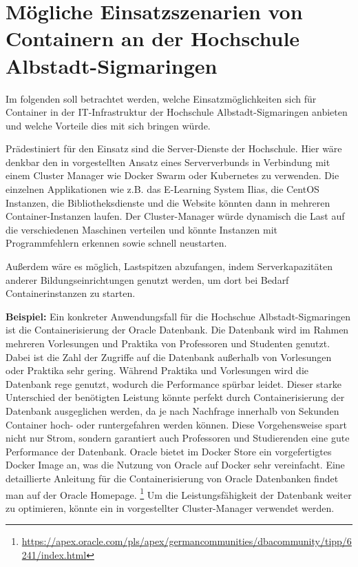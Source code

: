 \section{Mögliche Einsatzszenarien von Containern an der Hochschule Albstadt-Sigmaringen}
\label{sec:HS}
Im folgenden soll betrachtet werden, welche Einsatzmöglichkeiten sich für Container in der IT-Infrastruktur der Hochschule Albstadt-Sigmaringen anbieten und welche Vorteile dies mit sich bringen würde. 

Prädestiniert für den Einsatz sind die Server-Dienste der Hochschule.
Hier wäre denkbar den in  vorgestellten Ansatz eines Serververbunds in Verbindung mit einem Cluster Manager wie Docker Swarm oder Kubernetes zu verwenden.
Die einzelnen Applikationen wie z.B. das E-Learning System Ilias, die CentOS Instanzen, die Bibliotheksdienste und die Website könnten dann in mehreren Container-Instanzen laufen.
Der Cluster-Manager würde dynamisch die Last auf die verschiedenen Maschinen verteilen und könnte Instanzen mit Programmfehlern erkennen sowie schnell neustarten.

Außerdem wäre es möglich, Lastspitzen abzufangen, indem Serverkapazitäten anderer Bildungseinrichtungen genutzt werden, um dort bei Bedarf Containerinstanzen zu starten.

\textbf{Beispiel:}\newline
Ein konkreter Anwendungsfall für die Hochschue Albstadt-Sigmaringen ist die Containerisierung der Oracle Datenbank. Die Datenbank wird im Rahmen mehreren Vorlesungen und Praktika von Professoren und Studenten genutzt.
Dabei ist die Zahl der Zugriffe auf die Datenbank außerhalb von Vorlesungen oder Praktika sehr gering.
Während Praktika und Vorlesungen wird die Datenbank rege genutzt, wodurch die Performance spürbar leidet.
Dieser starke Unterschied der benötigten Leistung könnte perfekt durch Containerisierung der Datenbank ausgeglichen werden, da je nach Nachfrage innerhalb von Sekunden Container hoch- oder runtergefahren werden können.
Diese Vorgehensweise spart nicht nur Strom, sondern garantiert auch Professoren und Studierenden eine gute Performance der Datenbank. Oracle bietet im Docker Store ein vorgefertigtes Docker Image an, was die Nutzung von Oracle auf Docker sehr vereinfacht.
Eine detaillierte Anleitung für die Containerisierung von Oracle Datenbanken findet man auf der Oracle Homepage.
\footnote{\url{https://apex.oracle.com/pls/apex/germancommunities/dbacommunity/tipp/6241/index.html}}
Um die Leistungsfähigkeit der Datenbank weiter zu optimieren, könnte ein in  vorgestellter Cluster-Manager verwendet werden.
